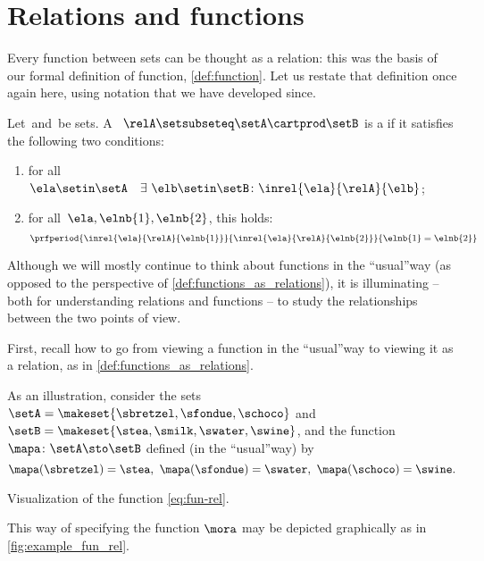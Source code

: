 
\section{Relations and functions}

Every function between sets can be thought as a relation: this was the basis of our formal definition of function, \cref{def:function}.
Let us restate that definition once again here, using notation that we have developed since.

\begin{ctdefinition}
    \label{def:functions_as_relations}
    Let~\setA and~\setB be sets.
    A ~$\relA \setsubseteq \setA \cartprod \setB$ is a \emph{} if it satisfies the following two conditions:
    \begin{enumerate}
        \item for all~$\ela \setin \setA \quad \exists \ \elb \setin \setB\colon  \inrel{\ela}{\relA}{\elb}$;
        \item for all~$\ela, \elnb{1}, \elnb{2}$, this holds:
              \begin{equation}
                  \prfperiod{
                      \inrel{\ela}{\relA}{\elnb{1}}
                  }{
                     \inrel{\ela}{\relA}{\elnb{2}}
                  }{
                      \elnb{1} = \elnb{2}
                  }
              \end{equation}
    \end{enumerate}
\end{ctdefinition}

Although we will mostly continue to think about functions in the ``usual''way (as opposed to the perspective of \cref{def:functions_as_relations}), it is illuminating -- both for understanding relations and functions -- to study the relationships between the two points of view.

First, recall how to go from viewing a function in the ``usual''way to viewing it as a relation, as in \cref{def:functions_as_relations}.

As an illustration, consider the sets~$\setA = \makeset{ \sbretzel, \sfondue, \schoco }$ and~$\setB = \makeset{ \stea, \smilk, \swater, \swine }$, and the function~$\mapa \colon \setA \sto \setB$ defined (in the ``usual''way) by
\begin{equation}
    \mapa (\sbretzel) = \stea, \ \mapa (\sfondue) = \swater, \ \mapa(\schoco) = \swine.
\end{equation}
\begin{marginfigure}
    \centering
    \caption{Visualization of the function \cref{eq:fun-rel}.}
    \label{fig:example_fun_rel}
\end{marginfigure}
This way of specifying the function $\mora$ may be depicted graphically as in \cref{fig:example_fun_rel}.

